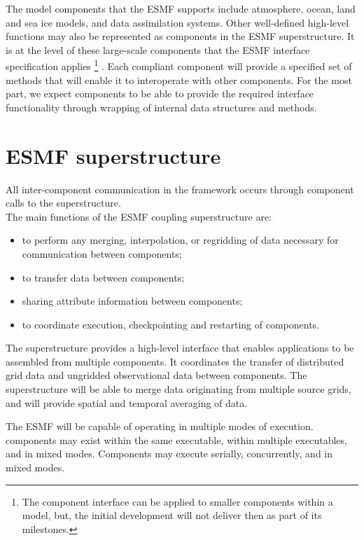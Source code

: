 The model components that the ESMF supports include atmosphere, ocean,
land and sea ice models, and data assimilation systems. Other
well-defined high-level functions may also be represented as
components in the ESMF superstructure.  It is at the level of these
large-scale components that the ESMF interface specification applies
\footnote{
The component interface can be applied to smaller components within a model,
but, the initial development will not deliver then as part of its milestones.
}
.
Each compliant component will provide a specified set of methods that
will enable it to interoperate with other components.  For the most
part, we expect components to be able to provide the required
interface functionality through wrapping of internal data structures
and methods.

\section{ESMF superstructure}
\label{sec:ESMF_superstructure}

All inter-component communication in the framework occurs through 
component calls to the superstructure. \\

\noindent The main functions of the ESMF coupling superstructure are:

\begin{itemize}
\item to perform any merging, interpolation, or regridding 
of data necessary for communication between components;
\item to transfer data between components;
\item sharing attribute information between components;
\item to coordinate execution, checkpointing and restarting of
  components.
\end{itemize}

The superstructure provides a high-level interface that enables 
applications to be assembled from multiple components.  It coordinates
the transfer of distributed grid data and ungridded 
observational data between components.  The superstructure will be able 
to merge data originating from multiple source grids, and will 
provide spatial and temporal averaging of data.

The ESMF will be capable of operating in multiple modes of execution.
components may exist within the same executable, within multiple 
executables, and in mixed modes.  Components may execute serially, 
concurrently, and in mixed modes.  

